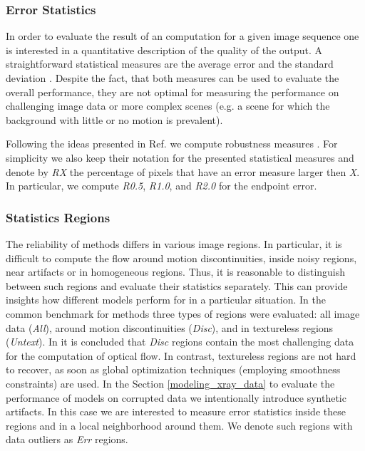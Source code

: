\subsubsection{Error Statistics}
\label{error_statistics}

In order to evaluate the result of an \opticalflow computation for a given image sequence one is interested in a quantitative description of the quality of the output. A straightforward statistical measures are the average error  and the standard deviation \cite{Barron94}. Despite the fact, that both measures can be used to evaluate the overall performance, they are not optimal for measuring the performance on challenging image data or more complex scenes (e.g. a scene for which the background with little or no motion is prevalent).

Following the ideas presented in Ref. \cite{Middl} we compute robustness measures \cite{Scharstein02}. For simplicity we also keep their notation for the presented statistical measures and denote by \textit{RX} the percentage of pixels that have an error measure larger then \textit{X}. In particular, we compute \textit{R0.5}, \textit{R1.0}, and \textit{R2.0} for the endpoint error. 


\subsubsection{Statistics Regions}
\label{statistics_regions}

The reliability of \opticalflow methods differs in various image regions. In particular, it is difficult to compute the flow around motion discontinuities, inside noisy regions, near artifacts or in homogeneous regions. Thus, it is reasonable to distinguish between such regions and evaluate their statistics separately. This can provide insights how different \opticalflow models perform for in a particular situation.  In the common benchmark for \opticalflow methods \cite{Middl} three types of regions were evaluated: all image data (\textit{All}), around motion discontinuities (\textit{Disc}), and in textureless regions (\textit{Untext}). In \cite{Middl} it is concluded that \textit{Disc} regions contain the most challenging data for the computation of optical flow. In contrast, 
textureless regions are not hard to recover, as soon as global optimization techniques (employing smoothness constraints) are used.
In the Section \ref{modeling_xray_data} to evaluate the performance of \opticalflow models on corrupted data we intentionally introduce synthetic artifacts. In this case we are interested to measure error statistics inside these regions and in a local neighborhood around them. We denote such regions with data outliers as \textit{Err} regions.

